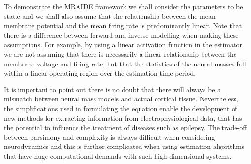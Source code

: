 \documentclass[11pt,draftcls,onecolumn,peerreview]{IEEEtran}
\begin{document}
To demonstrate the MRAIDE framework we shall consider the parameters to be static and we shall also assume that the relationship between the mean membrane potential and the mean firing rate is predominantly linear. Note that there is a difference between forward and inverse modelling when making these assumptions. For example, by using a linear activation function in the estimator we are not assuming that there is necessarily a linear relationship between the membrane voltage and firing rate, but that the statistics of the neural masses fall within a linear operating region over the estimation time period. 

It is important to point out there is no doubt that there will always be a mismatch between neural mass models and actual cortical tissue. Nevertheless, the simplifications used in formulating the equation enable the development of new methods for extracting information from electrophysiological data, that has the potential to influence the treatment of diseases such as epilepsy. The trade-off between parsimony and complexity is always difficult when considering neurodynamics and this is further complicated when using estimation algorithms that have huge computational demands with such high-dimensional systems.
\end{document}
